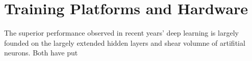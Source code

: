 \section{Training Platforms and Hardware}
The superior performance observed in recent years' deep learning is largely founded on the largely extended hidden layers and shear volumne of artifitial neurons. Both have put 